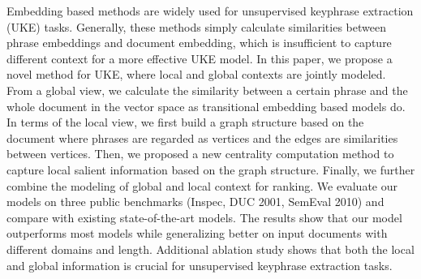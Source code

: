 Embedding based methods are widely used for unsupervised keyphrase extraction (UKE) tasks. Generally, these methods simply calculate similarities between phrase embeddings and document embedding, which is insufficient to capture different context for a more effective UKE model. In this paper, we propose a novel method for UKE, where local and global contexts are jointly modeled. From a global view, we calculate the similarity between a certain phrase and the whole document in the vector space as transitional embedding based models do. In terms of the local view, we first build a graph structure based on the document where phrases are regarded as vertices and the edges are similarities between vertices. Then, we proposed a new centrality computation method to capture local salient information based on the graph structure. Finally, we further combine the modeling of global and local context for ranking. We evaluate our models on three public benchmarks (Inspec, DUC 2001, SemEval 2010) and compare with existing state-of-the-art models. The results show that our model outperforms most models while generalizing better on input documents with different domains and length. Additional ablation study shows that both the local and global information is crucial for unsupervised keyphrase extraction tasks.
